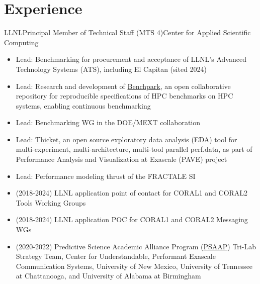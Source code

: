 \section{Experience}

		{LLNL}{Principal Member of Technical Staff (MTS 4)}{Center for Applied Scientific Computing}{}
		{\begin{itemize}
		      \item %
		      	Lead: Benchmarking for procurement and acceptance of LLNL's Advanced Technology Systems (ATS),
			including El Capitan (sited 2024) %
		      \item Lead: Research and development of \href{https://github.com/LLNL/benchpark}{Benchpark}, 
		      	an open collaborative repository for reproducible specifications of HPC benchmarks
			on HPC systems, enabling continuous benchmarking %
	               \item Lead: Benchmarking WG in the DOE/MEXT collaboration
		      \item Lead: \href{https://thicket.readthedocs.io/en/latest/}{Thicket}, an open source
		      	exploratory data analysis (EDA) tool for multi-experiment, multi-architecture, multi-tool parallel perf.data,
			as part of Performance Analysis and Visualization at Exascale (PAVE) project %
	               \item Lead: Performance modeling thrust of the FRACTALE SI %
		    \item (2018-2024) LLNL application point of contact for CORAL1 and CORAL2 Tools Working Groups %
	             \item (2018-2024) LLNL application POC for CORAL1 and CORAL2 Messaging 	
	             	WGs %
		    \item (2020-2022) Predictive Science Academic Alliance Program (\href{https://psaap.llnl.gov}{PSAAP}) Tri-Lab Strategy Team, 
			Center for Understandable, Performant Exascale Communication Systems, University of New Mexico, 
			University of Tennessee at Chattanooga, and University of Alabama at Birmingham
		 \end{itemize}
		}
